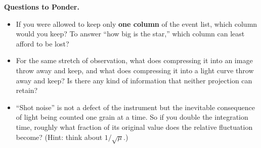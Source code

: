 \medskip
\noindent\textbf{Questions to Ponder.}
\begin{itemize}
  \item If you were allowed to keep only \textbf{one column} of the event list, which column would you keep? To answer ``how big is the star,'' which column can least afford to be lost?
  \item For the same stretch of observation, what does compressing it into an image throw away and keep, and what does compressing it into a light curve throw away and keep? Is there any kind of information that neither projection can retain?
  \item ``Shot noise'' is not a defect of the instrument but the inevitable consequence of light being counted one grain at a time. So if you double the integration time, roughly what fraction of its original value does the relative fluctuation become? (Hint: think about \(1/\sqrt{\mu}\).)
\end{itemize}
